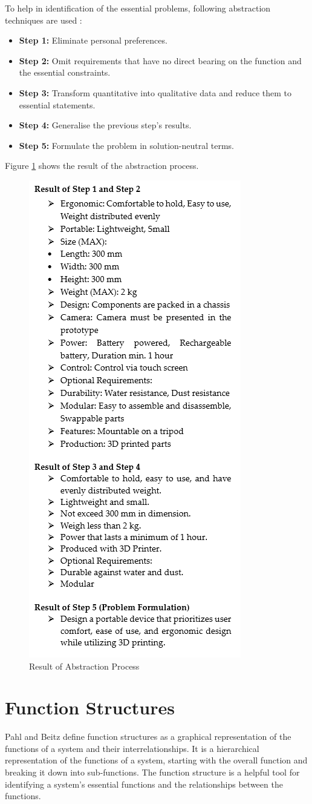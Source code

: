 To help in identification of the essential problems, following abstraction techniques are used \cite{Pahl07c}:

\begin{itemize}
    \item \textbf{Step 1:} Eliminate personal preferences.
    \item \textbf{Step 2:} Omit requirements that have no direct bearing on the function and the essential constraints.
    \item \textbf{Step 3:} Transform quantitative into qualitative data and reduce them to essential statements.
    \item \textbf{Step 4:} Generalise the previous step's results.
    \item \textbf{Step 5:} Formulate the problem in solution-neutral terms.
\end{itemize}

Figure \ref{fig:result-abstraction-process} shows the result of the abstraction process.

\begin{figure}[ht!]
    \centering
    \includegraphics[width=0.4\linewidth]{texs/Part1/chapter3/image/abstractionresult.png}
    \caption{Result of Abstraction Process}
    \label{fig:result-abstraction-process}
\end{figure}


\section{Function Structures}
Pahl and Beitz \cite{Pahl07e} define function structures as a graphical representation of the functions of a system and their interrelationships. It is a hierarchical representation of the functions of a system, starting with the overall function and breaking it down into sub-functions. The function structure is a helpful tool for identifying a system's essential functions and the relationships between the functions.

